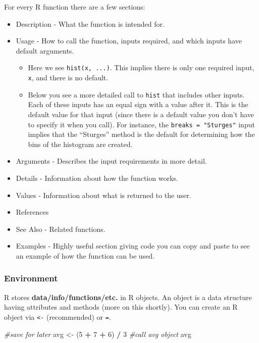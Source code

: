 \documentclass[
]{book}
\newenvironment{Shaded}{\begin{snugshade}}{\end{snugshade}}
\newcommand{\CommentTok}[1]{\textcolor[rgb]{0.56,0.35,0.01}{\textit{#1}}}
\newcommand{\DecValTok}[1]{\textcolor[rgb]{0.00,0.00,0.81}{#1}}
\newcommand{\NormalTok}[1]{#1}
\newcommand{\OperatorTok}[1]{\textcolor[rgb]{0.81,0.36,0.00}{\textbf{#1}}}
\newcommand{\StringTok}[1]{\textcolor[rgb]{0.31,0.60,0.02}{#1}}
\providecommand{\tightlist}{%
  \setlength{\itemsep}{0pt}\setlength{\parskip}{0pt}}
\theoremstyle{definition}
\theoremstyle{definition}
\theoremstyle{definition}
\theoremstyle{remark}
\begin{document}
For every R function there are a few sections:

\begin{itemize}
\item
  Description - What the function is intended for.
\item
  Usage - How to call the function, inputs required, and which inputs have default arguments.

  \begin{itemize}
  \tightlist
  \item
    Here we see \texttt{hist(x,\ ...)}. This implies there is only one required input, \texttt{x}, and there is no default.\\
  \item
    Below you see a more detailed call to \texttt{hist} that includes other inputs. Each of these inputs has an equal sign with a value after it. This is the default value for that input (since there is a default value you don't have to specify it when you call). For instance, the \texttt{breaks\ =\ "Sturges"} input implies that the ``Sturges'' method is the default for determining how the bins of the histogram are created.
  \end{itemize}
\item
  Arguments - Describes the input requirements in more detail.
\item
  Details - Information about how the function works.
\item
  Values - Information about what is returned to the user.
\item
  References
\item
  See Also - Related functions.
\item
  Examples - Highly useful section giving code you can copy and paste to see an example of how the function can be used.
\end{itemize}

\hypertarget{environment-1}{%
\subsubsection{Environment}\label{environment-1}}

R stores \textbf{data/info/functions/etc.} in R objects. An object is a data structure having attributes and methods (more on this shortly). You can create an R object via \texttt{\textless{}-} (recommended) or \texttt{=}.

\begin{Shaded}
\begin{Highlighting}[]
\CommentTok{#save for later}
\NormalTok{avg <-}\StringTok{ }\NormalTok{(}\DecValTok{5} \OperatorTok{+}\StringTok{ }\DecValTok{7} \OperatorTok{+}\StringTok{ }\DecValTok{6}\NormalTok{) }\OperatorTok{/}\StringTok{ }\DecValTok{3}
\CommentTok{#call avg object}
\NormalTok{avg}
\end{Highlighting}
\end{Shaded}
\end{document}
